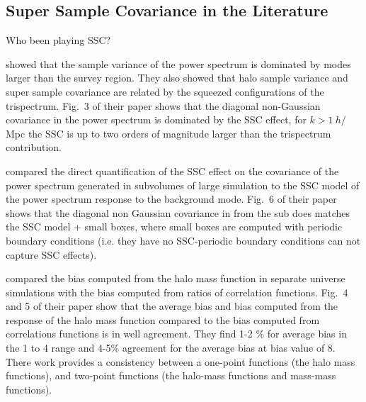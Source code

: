 \newcommand{\sph}[2]{Y^\text{R}_{l_#1 m_#1}(\hat{#2})}

\newcommand{\jl}[1]{j_{l_#1}}
\newcommand{\dk}{\frac{ d^3 \mathbf{k}}{(2 \pi)^3}} 
\newcommand{ \dkv}[1]{\frac{ d^3 \mathbf{k}_{#1}}{(2 \pi)^3}} 
\newcommand{\obs}{\mathcal{O}}

\subsection{Super Sample Covariance in the Literature}

Who been playing SSC? 

\cite{2013PhRvD..87l3504T} showed that the sample variance of the power spectrum is dominated by modes larger than the survey region. They also showed that halo sample variance and super sample covariance are related by the squeezed configurations of the trispectrum. Fig.~3 of their paper shows that the diagonal non-Gaussian covariance in the power spectrum is dominated by the SSC effect, for $k > 1 ~h/$Mpc the SSC is up to two orders of magnitude larger than the trispectrum contribution. 

\cite{2014PhRvD..89h3519L} compared the direct quantification of the SSC effect on the covariance of the power spectrum generated in subvolumes of large simulation to the SSC model of the power spectrum response to the background mode. Fig.~6 of their paper shows that the diagonal non Gaussian covariance in from the sub does matches the SSC model + small boxes, where small boxes are computed with periodic boundary conditions (i.e. they have no SSC-periodic boundary conditions can not capture SSC effects). 

\cite{2016PhRvD..93f3507L} compared the bias computed from the halo mass function in separate universe simulations with the bias computed from ratios of correlation functions. Fig.~4 and 5 of their paper show that the average bias and bias computed from the response of the halo mass function compared to the bias computed from correlations functions is in well agreement. They find 1-2 \% for average bias in the 1 to 4 range and 4-5\% agreement for the average bias at bias value of 8. There work provides a consistency between a one-point functions (the halo mass functions), and two-point functions (the halo-mass functions and mass-mass functions). 